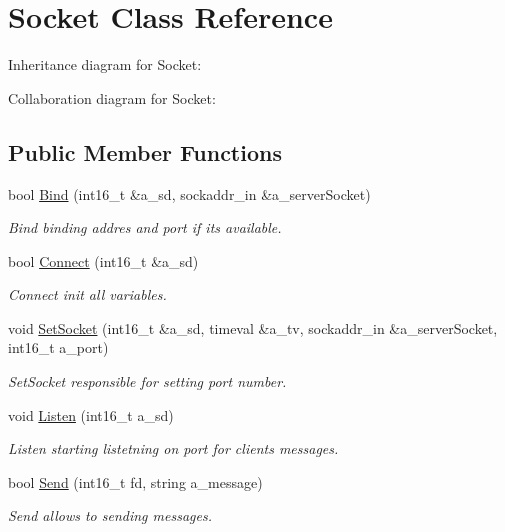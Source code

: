\hypertarget{classSocket}{}\section{Socket Class Reference}
\label{classSocket}


Inheritance diagram for Socket\+:


Collaboration diagram for Socket\+:
\subsection*{Public Member Functions}
\begin{DoxyCompactItemize}
\item 
bool \hyperlink{classSocket_a0d98a4408b7b7b76957a1617f490bd64}{Bind} (int16\+\_\+t \&a\+\_\+sd, sockaddr\+\_\+in \&a\+\_\+server\+Socket)
\begin{DoxyCompactList}\small\item\em Bind binding addres and port if it\textquotesingle{}s available. \end{DoxyCompactList}\item 
bool \hyperlink{classSocket_a4786650bf1e156334c9cd40b83bdfeca}{Connect} (int16\+\_\+t \&a\+\_\+sd)
\begin{DoxyCompactList}\small\item\em Connect init all variables. \end{DoxyCompactList}\item 
void \hyperlink{classSocket_a4d90cf071742bfa7183c2dee55bfbade}{Set\+Socket} (int16\+\_\+t \&a\+\_\+sd, timeval \&a\+\_\+tv, sockaddr\+\_\+in \&a\+\_\+server\+Socket, int16\+\_\+t a\+\_\+port)
\begin{DoxyCompactList}\small\item\em Set\+Socket responsible for setting port number. \end{DoxyCompactList}\item 
void \hyperlink{classSocket_ac7d1ada7822958bc98fb70bd9cc75f0c}{Listen} (int16\+\_\+t a\+\_\+sd)
\begin{DoxyCompactList}\small\item\em Listen starting listetning on port for clients messages. \end{DoxyCompactList}\item 
bool \hyperlink{classSocket_ad41fd961210164e62d0613131ccceb51}{Send} (int16\+\_\+t fd, string a\+\_\+message)
\begin{DoxyCompactList}\small\item\em Send allows to sending messages. \end{DoxyCompactList}\item 

\end{DoxyCompactItemize}
